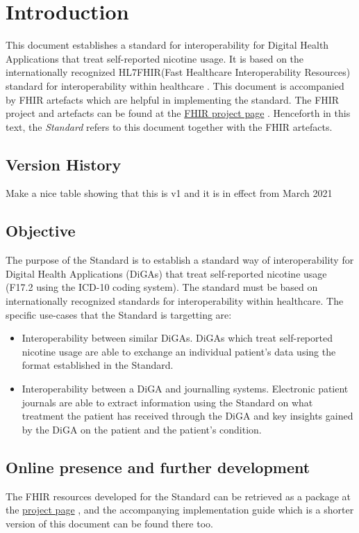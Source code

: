 \documentclass[12px]{report}
\newcommand{\fhir}{FHIR\textsuperscript{\textregistered}}
\newcommand{\hl}{HL7\textsuperscript{\textregistered}}
\begin{document}
\tableofcontents

\chapter{Introduction}
\label{ch:intro}

This document establishes a standard for interoperability for Digital Health Applications that treat self-reported nicotine usage. It is based on the internationally recognized \hl \fhir (Fast Healthcare Interoperability Resources) standard for interoperability 
within healthcare \cite{FHIR}. This document is accompanied by FHIR artefacts which are helpful in implementing the standard. The FHIR project and artefacts can be found at the \href{https://simplifier.net/treat-nicotine-usage-diga}{FHIR project page} \cite{project}.
Henceforth in this text, the \textit{Standard} refers to this document together with the FHIR artefacts.

\section{Version History}
Make a nice table showing that this is v1 and it is in effect from March 2021

\section{Objective}
The purpose of the Standard is to establish a standard way of interoperability for Digital Health Applications (DiGAs) that treat self-reported nicotine usage (F17.2 using the ICD-10 coding system). The standard must be based on internationally recognized
standards for interoperability within healthcare. The specific use-cases that the Standard is targetting are:

\begin{itemize}
    \item Interoperability between similar DiGAs. DiGAs which treat self-reported nicotine usage are able to exchange an individual patient's data using the format established in the Standard.
    \item Interoperability between a DiGA and journalling systems. Electronic patient journals are able to extract information using the Standard on what treatment the patient has received through the DiGA and key insights gained by the DiGA on the patient and the patient's condition.
\end{itemize}

\section{Online presence and further development}
The FHIR resources developed for the Standard can be retrieved as a package at the \href{https://simplifier.net/treat-nicotine-usage-diga}{project page} \cite{project}, 
and the accompanying implementation guide which is a shorter version of this document can be found there too.
\end{document}
